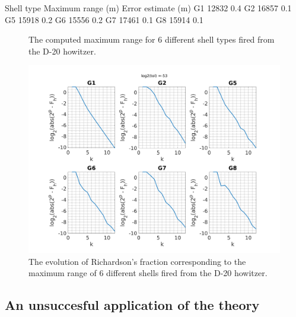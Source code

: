\documentclass[runningheads]{llncs}
\begin{document}
\begin{myverbbox}[\normalsize]{\vgamma}
Shell type  Maximum range (m) Error estimate (m)
    G1           12832                0.4 
    G2           16857                0.1 
    G5           15918                0.2 
    G6           15556                0.2 
    G7           17461                0.1 
    G8           15914                0.1 
\end{myverbbox}

\begin{figure}
  \centering
  \vgamma
  \caption{The computed maximum range for 6 different shell types fired from the D-20 howitzer.}
  \label{fig:maxrange_rk1_table_tol53} 
\end{figure}

\begin{figure}
  \centering
  \includegraphics[width=12cm]{maxrange_rk1_tol53.png}
  \caption{The evolution of Richardson's fraction corresponding to the maximum range of 6 different shells fired from the D-20 howitzer.} \label{fig:maxrange_rk1_fraction_tol53}
\end{figure}

\subsection{An unsuccesful application of the theory}
\end{document}
